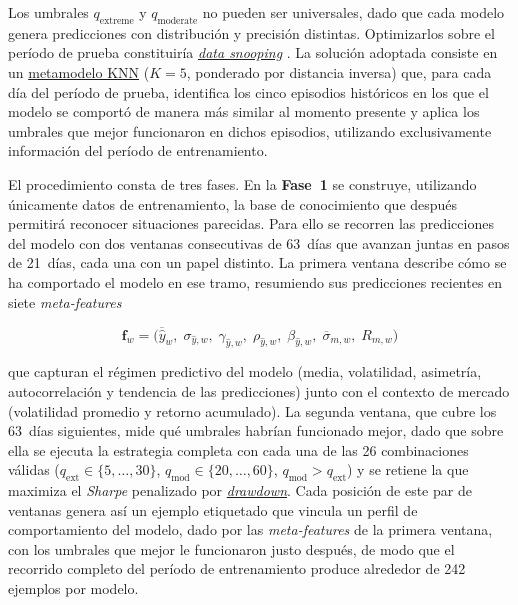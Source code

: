 ﻿\documentclass[11pt,a4paper]{article}
\begin{document}
Los umbrales $q_{\text{extreme}}$ y $q_{\text{moderate}}$ no pueden ser universales, dado que cada modelo genera predicciones con distribuci\'on y precisi\'on distintas. Optimizarlos sobre el per\'iodo de prueba constituir\'ia \hyperlink{glos:data_snooping}{\textit{data snooping}} \citep{lopezdeprado2018}. La soluci\'on adoptada consiste en un \hyperlink{glos:meta_knn}{metamodelo KNN} ($K{=}5$, ponderado por distancia inversa) que, para cada d\'ia del per\'iodo de prueba, identifica los cinco episodios hist\'oricos en los que el modelo se comport\'o de manera m\'as similar al momento presente y aplica los umbrales que mejor funcionaron en dichos episodios, utilizando exclusivamente informaci\'on del per\'iodo de entrenamiento.

El procedimiento consta de tres fases. En la \textbf{Fase~1} se construye, utilizando \'unicamente datos de entrenamiento, la base de conocimiento que despu\'es permitir\'a reconocer situaciones parecidas. Para ello se recorren las predicciones del modelo con dos ventanas consecutivas de 63~d\'ias que avanzan juntas en pasos de 21~d\'ias, cada una con un papel distinto. La primera ventana describe c\'omo se ha comportado el modelo en ese tramo, resumiendo sus predicciones recientes en siete \textit{meta-features}

\begin{equation}
\mathbf{f}_w = \big(\overline{\hat{y}}_w,\; \sigma_{\hat{y},w},\; \gamma_{\hat{y},w},\; \rho_{\hat{y},w},\; \beta_{\hat{y},w},\; \overline{\sigma}_{m,w},\; R_{m,w}\big)
\label{eq:meta_features}
\end{equation}

\noindent que capturan el r\'egimen predictivo del modelo (media, volatilidad, asimetr\'ia, autocorrelaci\'on y tendencia de las predicciones) junto con el contexto de mercado (volatilidad promedio y retorno acumulado). La segunda ventana, que cubre los 63~d\'ias siguientes, mide qu\'e umbrales habr\'ian funcionado mejor, dado que sobre ella se ejecuta la estrategia completa con cada una de las 26 combinaciones v\'alidas ($q_{\text{ext}} \in \{5,\ldots,30\}$, $q_{\text{mod}} \in \{20,\ldots,60\}$, $q_{\text{mod}} > q_{\text{ext}}$) y se retiene la que maximiza el \textit{Sharpe} penalizado por \hyperlink{glos:drawdown}{\textit{drawdown}}. Cada posici\'on de este par de ventanas genera as\'i un ejemplo etiquetado que vincula un perfil de comportamiento del modelo, dado por las \textit{meta-features} de la primera ventana, con los umbrales que mejor le funcionaron justo despu\'es, de modo que el recorrido completo del per\'iodo de entrenamiento produce alrededor de 242 ejemplos por modelo.
\end{document}
